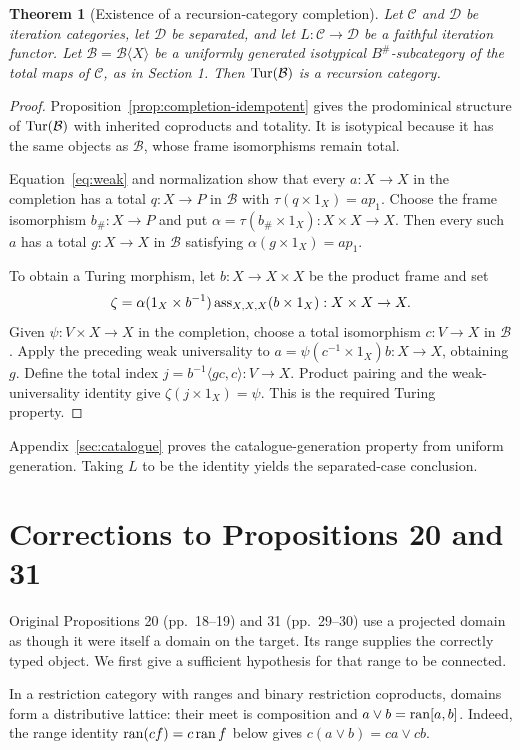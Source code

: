 \documentclass[11pt]{article}
\newtheorem{theorem}{Theorem}[section]
\newcommand{\C}{\mathcal C}\newcommand{\D}{\mathcal D}\newcommand{\B}{\mathcal B}
\begin{document}
\begin{theorem}[Existence of a recursion-category completion]\label{thm:main}
Let $\C$ and $\D$ be iteration categories, let $\D$ be separated, and let $L:\C\to\D$ be a faithful iteration functor. Let $\B=\B\langle X\rangle$ be a uniformly generated isotypical $B^\#$-subcategory of the total maps of $\C$, as in Section 1. Then $\Tur(\B)$ is a recursion category.
\end{theorem}
\begin{proof}
Proposition~\ref{prop:completion-idempotent} gives the prodominical structure of $\Tur(\B)$ with inherited coproducts and totality. It is isotypical because it has the same objects as $\B$, whose frame isomorphisms remain total.

Equation~\eqref{eq:weak} and normalization show that every $a:X\to X$ in the completion has a total $q:X\to P$ in $\B$ with $\tau(q\times1_X)=ap_1$. Choose the frame isomorphism $b_\#:X\to P$ and put $\alpha=\tau(b_\#\times1_X):X\times X\to X$. Then every such $a$ has a total $g:X\to X$ in $\B$ satisfying $\alpha(g\times1_X)=ap_1$.

To obtain a Turing morphism, let $b:X\to X\times X$ be the product frame and set
\[
\zeta=\alpha(1_X\times b^{-1})\operatorname{ass}_{X,X,X}(b\times1_X):X\times X\to X.
\]
Given $\psi:V\times X\to X$ in the completion, choose a total isomorphism $c:V\to X$ in $\B$. Apply the preceding weak universality to $a=\psi(c^{-1}\times1_X)b:X\to X$, obtaining $g$. Define the total index $j=b^{-1}\langle gc,c\rangle:V\to X$. Product pairing and the weak-universality identity give $\zeta(j\times1_X)=\psi$. This is the required Turing property.
\end{proof}

Appendix~\ref{sec:catalogue} proves the catalogue-generation property from uniform generation. Taking $L$ to be the identity yields the separated-case conclusion.

\section{Corrections to Propositions 20 and 31}\label{sec:projected-ranges}
Original Propositions 20 (pp.~18--19) and 31 (pp.~29--30) use a projected domain as though it were itself a domain on the target. Its range supplies the correctly typed object. We first give a sufficient hypothesis for that range to be connected.

In a restriction category with ranges and binary restriction coproducts, domains form a distributive lattice: their meet is composition and $a\vee b=\operatorname{ran}[a,b]$. Indeed, the range identity $\operatorname{ran}(cf)=c\operatorname{ran} f$ below gives $c(a\vee b)=ca\vee cb$.
\end{document}
